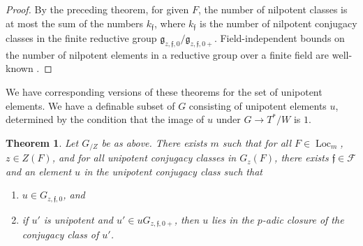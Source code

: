 \documentclass[12pt]{amsart}
\newcommand{\op}[1]{\operatorname{#1}}
\def\s{{\mathfrak{f}}}
\newcommand{\cF}{\mathcal{F}}
\newcommand{\fg}{\mathfrak{g}}
\theoremstyle{plain}
\newtheorem{theorem}[thm]{Theorem}
\theoremstyle{definition}
\begin{document}
\begin{proof} By the preceding theorem, for given $F$, the number of
  nilpotent classes is at most the sum of the numbers $k_\s$, where
  $k_\s$ is the number of nilpotent conjugacy classes in the finite
  reductive group $\fg_{z,\s,0}/\fg_{z,\s,0+}$.  Field-independent
  bounds on the number of nilpotent elements in a reductive
  group over a finite field are well-known \cite{carter1985finite}.
\end{proof}

We have corresponding versions of these theorems for the set of
unipotent elements.  We have a definable subset of $G$ consisting of
unipotent elements $u$, determined by the condition that the image of
$u$ under $G\to T^*/W$ is $1$.

\begin{theorem} Let $G_{/Z}$ be as above.  There exists
  $m$ such that for all $F\in \op{Loc}_m$, $z\in Z(F)$, and for all unipotent
  conjugacy classes in $G_z(F)$, there exists $\s\in \cF$ and an element
  $u$ in the unipotent conjugacy class such that
\begin{enumerate}
   \item $u\in G_{z,\s,0}$, and
   \item if $u'$ is unipotent and $u'\in u G_{z,\s,0+}$, then $u$
     lies in the $p$-adic closure of the conjugacy class of $u'$.
\end{enumerate}
\end{theorem}
\end{document}
